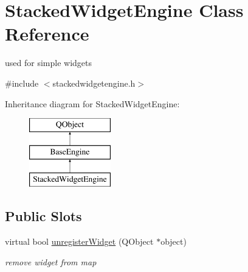 \hypertarget{class_stacked_widget_engine}{}\section{Stacked\+Widget\+Engine Class Reference}
\label{class_stacked_widget_engine}


used for simple widgets  




{\ttfamily \#include $<$stackedwidgetengine.\+h$>$}

Inheritance diagram for Stacked\+Widget\+Engine\+:\begin{figure}[H]
\begin{center}
\leavevmode
\includegraphics[height=3.000000cm]{class_stacked_widget_engine}
\end{center}
\end{figure}
\subsection*{Public Slots}
\begin{DoxyCompactItemize}
\item 
\mbox{\label{class_stacked_widget_engine_a36c4ee8ee448a108d762a19f0289cee5}} 
virtual bool \hyperlink{class_stacked_widget_engine_a36c4ee8ee448a108d762a19f0289cee5}{unregister\+Widget} (Q\+Object $\ast$object)
\begin{DoxyCompactList}\small\item\em remove widget from map \end{DoxyCompactList}\end{DoxyCompactItemize}

